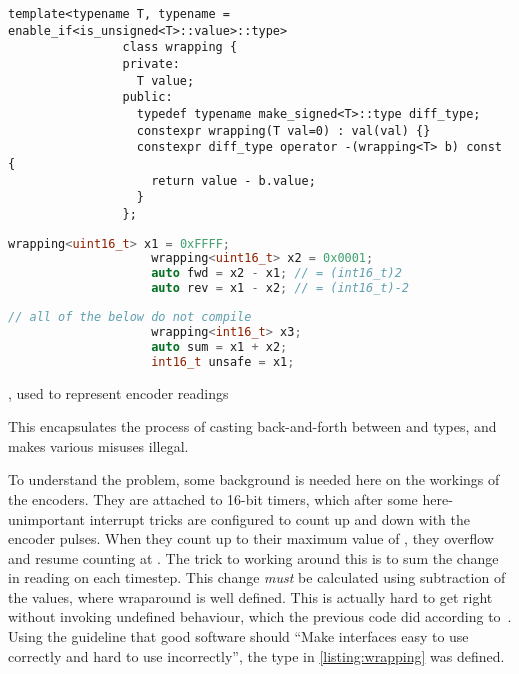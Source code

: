 \documentclass[main.tex]{subfiles}
\begin{document}
		\begin{listingfloat}[b!]
			\centering
			\begin{lstlisting}[language={[11]c++},frame=single,gobble=8]
				template<typename T, typename = enable_if<is_unsigned<T>::value>::type>
				class wrapping {
				private:
				  T value;
				public:
				  typedef typename make_signed<T>::type diff_type;
				  constexpr wrapping(T val=0) : val(val) {}
				  constexpr diff_type operator -(wrapping<T> b) const {
				    return value - b.value;
				  }
				};
			\end{lstlisting}%
			\begin{minipage}[t]{0.5\linewidth-1em}
				\begin{lstlisting}[language=c++,frame=single,gobble=10]
					wrapping<uint16_t> x1 = 0xFFFF;
					wrapping<uint16_t> x2 = 0x0001;
					auto fwd = x2 - x1; // = (int16_t)2
					auto rev = x1 - x2; // = (int16_t)-2
				\end{lstlisting}
			\end{minipage}\hfill
			\begin{minipage}[t]{0.5\linewidth-1em}
				\begin{lstlisting}[language=c++,frame=single,gobble=10]
					// all of the below do not compile
					wrapping<int16_t> x3;
					auto sum = x1 + x2;
					int16_t unsafe = x1;
				\end{lstlisting}
			\end{minipage}\hfill
			\caption{, used to represent encoder readings}
			\label{listing:wrapping}
			\medskip
			\small
			This encapsulates the process of casting back-and-forth between  and  types, and makes various misuses illegal.
		\end{listingfloat}

		To understand the problem, some background is needed here on the workings of the encoders.
		They are attached to 16-bit timers, which after some here-unimportant interrupt tricks are configured to count up and down with the encoder pulses. When they count up to their maximum value of , they overflow and resume counting at .
		The trick to working around this is to sum the change in reading on each timestep. This change \emph{must} be calculated using  subtraction of the values, where wraparound is well defined. This is actually hard to get right without invoking undefined behaviour, which the previous code did according to~\cite[Paragraph~5/4]{cpp-standard}.
		Using the guideline that good software should \enquote{Make interfaces easy to use correctly and hard to use incorrectly}\cite{meyers2004most}, the type in \cref{listing:wrapping} was defined.
\end{document}
